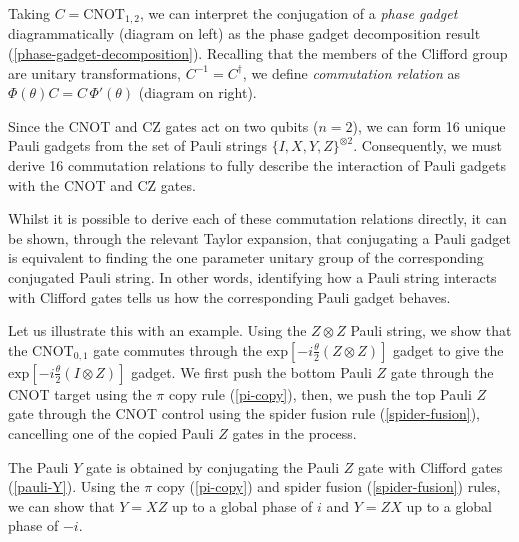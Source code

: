 Taking $C = \text{CNOT}_{1, 2}$, we can interpret the conjugation of a \textit{phase gadget} diagrammatically (diagram on left) as the phase gadget decomposition result (\ref{phase-gadget-decomposition}). Recalling that the members of the Clifford group are unitary transformations, $C^{-1} = C^\dagger$, we define \textit{commutation relation} as $\Phi(\theta) C = C \, \Phi'(\theta)$ (diagram on right).


Since the CNOT and CZ gates act on two qubits ($n=2$), we can form 16 unique Pauli gadgets from the set of Pauli strings $\{I, X, Y, Z\}^{\otimes 2}$. Consequently, we must derive 16 commutation relations to fully describe the interaction of Pauli gadgets with the CNOT and CZ gates.


Whilst it is possible to derive each of these commutation relations directly, it can be shown, through the relevant Taylor expansion, that conjugating a Pauli gadget is equivalent to finding the one parameter unitary group of the corresponding conjugated Pauli string. In other words, identifying how a Pauli string interacts with Clifford gates tells us how the corresponding Pauli gadget behaves.

Let us illustrate this with an example. Using the $Z \otimes Z$ Pauli string, we show that the $\text{CNOT}_{0, 1}$ gate commutes through the $\text{exp} \left[ - i\frac{\theta}{2} \left( Z \otimes Z \right) \right]$ gadget to give the $\text{exp} \left[ - i\frac{\theta}{2} \left( I \otimes Z \right) \right]$ gadget. We first push the bottom Pauli $Z$ gate through the CNOT target using the $\pi$ copy rule (\ref{pi-copy}), then, we push the top Pauli $Z$ gate through the CNOT control using the spider fusion rule (\ref{spider-fusion}), cancelling one of the copied Pauli $Z$ gates in the process.


The Pauli $Y$ gate is obtained by conjugating the Pauli $Z$ gate with Clifford gates (\ref{pauli-Y}). Using the $\pi$ copy (\ref{pi-copy}) and spider fusion (\ref{spider-fusion}) rules, we can show that $Y=XZ$ up to a global phase of $i$ and $Y=ZX$ up to a global phase of $-i$.

